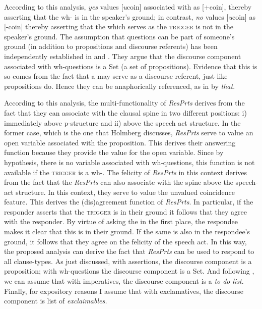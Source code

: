\documentclass[output=paper]{LSP/langsci}
\begin{document}
\noindent According to this analysis, \textit{yes} values [\textit{u}coin] associated with  as [+coin], thereby asserting that the wh- is in the speaker’s ground; in contrast, \textit{no} values [\textit{u}coin] as [-coin] thereby asserting that the  which serves as the \textsc{trigger} is not in the speaker’s ground.
The assumption that questions can be part of someone’s ground (in addition to propositions and discourse referents) has been independently established in \citet{Ginzburg1995I,Ginzburg1995II} and \citet{Roberts1996}. They argue that the discourse component associated with wh-questions is a  Set (a set of propositions). Evidence that this is so comes from the fact that a  may serve as a discourse referent, just like propositions do. Hence they can be anaphorically referenced, as in  by \textit{that}. 

According to this analysis, the multi-functionality of \textit{ResPrts} derives from the fact that they can associate with the clausal spine in two different positions: 
i) immediately above p-structure and 
ii) above the speech act structure.
In the former case, which is the one that Holmberg discusses, \textit{ResPrts} serve to value an open  variable associated with the proposition. This derives their answering function because they provide the value for the open variable.
Since by hypothesis, there is no  variable associated with wh-questions, this function is not available if the \textsc{trigger} is a wh-. The felicity of \textit{ResPrts} in this context derives from the fact that the \textit{ResPrts} can also associate with the spine above the speech-act structure.
In this context, they serve to value the unvalued coincidence feature.
This derives the (dis)agreement function of \textit{ResPrts}. In particular, if the responder asserts that the \textsc{trigger}  is in their ground it follows that they agree with the responder.
By virtue of asking the  in the first place, the respondee makes it clear that this  is in their ground.
If the same  is also in the respondee’s ground, it follows that they agree on the felicity of the speech act. In this way, the proposed analysis can derive the fact that \textit{ResPrts} can be used to respond to all clause-types. As just discussed, with assertions, the discourse component is a proposition; with wh-questions the discourse component is a  Set. And following \citet{Portner2004}, we can assume that with imperatives, the discourse component is a \textit{to do list}. Finally, for expository reasons I assume that with exclamatives, the discourse component is list of \textit{exclaimables.} 
\end{document}
